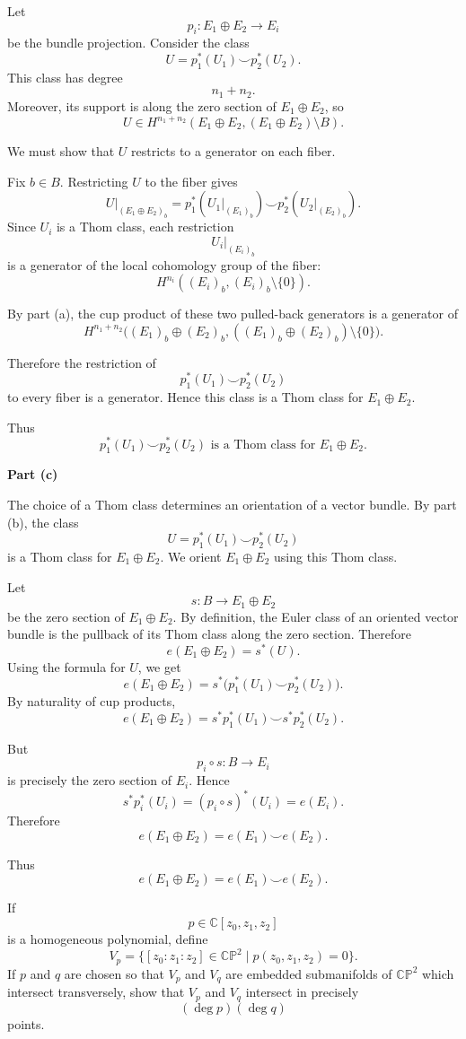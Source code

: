 \begin{solution}
Let
\[
p_i:E_1\oplus E_2\to E_i
\]
be the bundle projection. Consider the class
\[
U
=
p_1^*(U_1)\smile p_2^*(U_2).
\]
This class has degree
\[
n_1+n_2.
\]
Moreover, its support is along the zero section of \(E_1\oplus E_2\), so
\[
U\in H^{n_1+n_2}(E_1\oplus E_2,(E_1\oplus E_2)\setminus B).
\]

We must show that \(U\) restricts to a generator on each fiber.

Fix \(b\in B\). Restricting \(U\) to the fiber gives
\[
U|_{(E_1\oplus E_2)_b}
=
p_1^*(U_1|_{(E_1)_b})
\smile
p_2^*(U_2|_{(E_2)_b}).
\]
Since \(U_i\) is a Thom class, each restriction
\[
U_i|_{(E_i)_b}
\]
is a generator of the local cohomology group of the fiber:
\[
H^{n_i}((E_i)_b,(E_i)_b\setminus\{0\}).
\]

By part (a), the cup product of these two pulled-back generators is a generator of
\[
H^{n_1+n_2}
\bigl(
(E_1)_b\oplus (E_2)_b,
((E_1)_b\oplus (E_2)_b)\setminus\{0\}
\bigr).
\]

Therefore the restriction of
\[
p_1^*(U_1)\smile p_2^*(U_2)
\]
to every fiber is a generator. Hence this class is a Thom class for
\(E_1\oplus E_2\).

Thus
\[
\boxed{
	p_1^*(U_1)\smile p_2^*(U_2)
	\text{ is a Thom class for }E_1\oplus E_2.
}
\]


\medskip
\noindent\textbf{Part (c)}\par
\smallskip


The choice of a Thom class determines an orientation of a vector bundle. By part
(b), the class
\[
U
=
p_1^*(U_1)\smile p_2^*(U_2)
\]
is a Thom class for \(E_1\oplus E_2\). We orient \(E_1\oplus E_2\) using this Thom
class.

Let
\[
s:B\to E_1\oplus E_2
\]
be the zero section of \(E_1\oplus E_2\). By definition, the Euler class of an
oriented vector bundle is the pullback of its Thom class along the zero section.
Therefore
\[
e(E_1\oplus E_2)
=
s^*(U).
\]
Using the formula for \(U\), we get
\[
e(E_1\oplus E_2)
=
s^*\bigl(p_1^*(U_1)\smile p_2^*(U_2)\bigr).
\]
By naturality of cup products,
\[
e(E_1\oplus E_2)
=
s^*p_1^*(U_1)\smile s^*p_2^*(U_2).
\]

But
\[
p_i\circ s:B\to E_i
\]
is precisely the zero section of \(E_i\). Hence
\[
s^*p_i^*(U_i)
=
(p_i\circ s)^*(U_i)
=
e(E_i).
\]
Therefore
\[
e(E_1\oplus E_2)
=
e(E_1)\smile e(E_2).
\]

Thus
\[
\boxed{
	e(E_1\oplus E_2)=e(E_1)\smile e(E_2).
}
\]
\end{solution}

\begin{problem}
If
\[
p\in \mathbb C[z_0,z_1,z_2]
\]
is a homogeneous polynomial, define
\[
V_p
=
\{[z_0:z_1:z_2]\in \mathbb{CP}^2
\mid
p(z_0,z_1,z_2)=0\}.
\]
If \(p\) and \(q\) are chosen so that \(V_p\) and \(V_q\) are embedded
submanifolds of \(\mathbb{CP}^2\) which intersect transversely, show that
\(V_p\) and \(V_q\) intersect in precisely
\[
(\deg p)(\deg q)
\]
points.

\par

\noindent
\end{problem}

